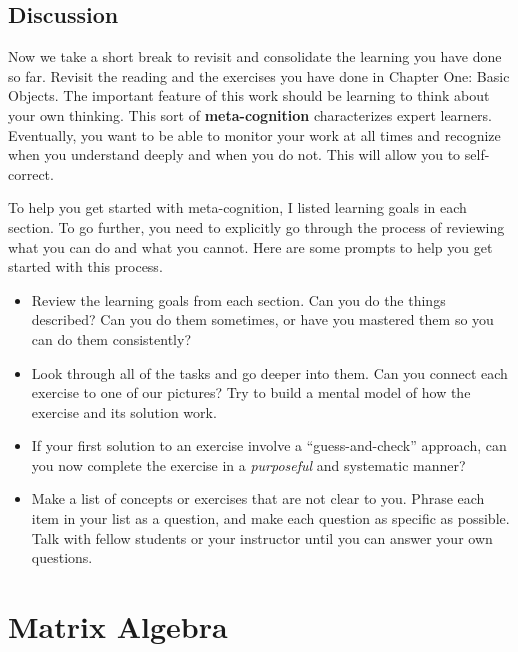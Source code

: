 \documentclass[10pt,]{book}
\newcommand{\terminology}[1]{\textbf{#1}}
\theoremstyle{plain}
\numberwithin{equation}{section}
\begin{document}
\subsection[Discussion]{Discussion}\label{subsection-35}
Now we take a short break to revisit and consolidate the learning you
      have done so far. Revisit the reading and the exercises you have done in
      Chapter One: Basic Objects. The important feature of this work should be
      learning to think about your own thinking. This sort of \terminology{meta-cognition}
      characterizes expert learners. Eventually, you want to be able to monitor
      your work at all times and recognize when you understand deeply and when
      you do not. This will allow you to self-correct.
\par
To help you get started with meta-cognition, I listed learning goals in
      each section. To go further, you need to explicitly go through the process
      of reviewing what you can do and what you cannot. Here are some prompts to
      help you get started with this process.
      \begin{itemize}
\item{}
          Review the learning goals from each section. Can you do the things
          described? Can you do them sometimes, or have you mastered them so you
          can do them consistently?
        \item{}
          Look through all of the tasks and go deeper into them. Can you
          connect each exercise to one of our pictures? Try to build a mental
          model of how the exercise and its solution work.
        \item{}
          If your first solution to an exercise involve a ``guess-and-check''
          approach, can you now complete the exercise in a \emph{purposeful}
          and systematic manner?
        \item{}
          Make a list of concepts or exercises that are not clear to you. Phrase
          each item in your list as a question, and make each question as
          specific as possible. Talk with fellow students or your
          instructor until you can answer your own questions.
        \end{itemize}

\clearpage
\typeout{************************************************}
\typeout{************************************************}
\section[Matrix Algebra]{Matrix Algebra}\label{matrix-algebra}
\typeout{************************************************}
\typeout{************************************************}
\end{document}
